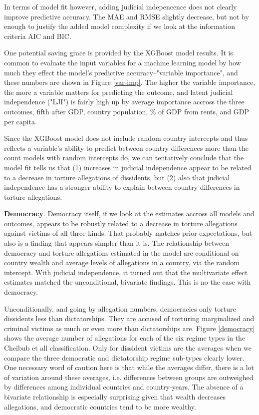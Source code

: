\documentclass[12pt]{article}
\begin{document}
In terms of model fit however, adding judicial indepencence does not clearly improve predictive accuracy. The MAE and RMSE slightly decrease, but not by enough to justify the added model complexity if we look at the information criteria AIC and BIC. 

One potential saving grace is provided by the XGBoost model results. It is common to evaluate the input variables for a machine learning model by how much they effect the model's predictive accuracy--"variable importance", and these numbers are shown in Figure \ref{var-imp}. The higher the variable importance, the more a variable matters for predicting the outcome, and latent judicial independence ("LJI") is fairly high up by average importance accross the three outcomes, fifth after GDP, country population, \% of GDP from rents, and GDP per capita. 

Since the XGBoost model does not include random country intercepts and thus reflects a variable's ability to predict between country differences more than the count models with random intercepts do, we can tentatively conclude that the model fit tells us that (1) increases in judicial independence appear to be related to a decrease in torture allegations of dissidents, but (2) also that judicial independence has a stronger ability to explain between country differences in torture allegations. 

\textbf{Democracy}. Democracy itself, if we look at the estimates accross all models and outcomes, appears to be robustly related to a decrease in torture allegations against victims of all three kinds. That probably matches prior expectations, but also is a finding that appears simpler than it is. The relationship between democracy and torture allegations estimated in the model are conditional on country wealth and average levels of allegations in a country, via the random intercept. With judicial independence, it turned out that the multivariate effect estimates matched the unconditional, bivariate findings. This is no the case with democracy. 

Unconditionally, and going by allegation numbers, democracies only torture dissidents less than dictatorships. They are accused of torturing marginalized and criminal victims as much or even more than dictatorships are. Figure \ref{democracy} shows the average number of allegations for each of the six regime types in the Cheibub et all classification. Only for dissident victims are the averages when we compare the three democratic and dictatorship regime sub-types clearly lower. One necessary word of caution here is that while the averages differ, there is a lot of variation around these averages, i.e. differences between groups are outweighed by differences among individual countries and country-years. The absence of a bivariate relationship is especially surprising given that wealth decreases allegations, and democratic countries tend to be more wealthy.  
\end{document}
